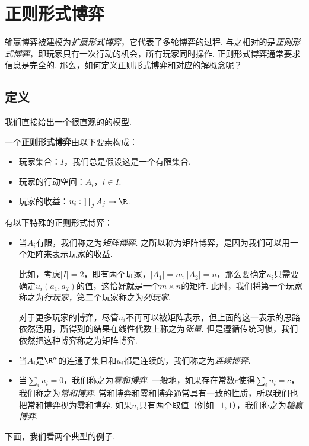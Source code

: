 \section{正则形式博弈}
输赢博弈被建模为\emph{扩展形式博弈}，它代表了多轮博弈的过程. 与之相对的是\emph{正则形式博弈}，即玩家只有一次行动的机会，所有玩家同时操作. 正则形式博弈通常要求信息是完全的. 那么，如何定义正则形式博弈和对应的解概念呢？

\subsection{定义}

我们直接给出一个很直观的的模型. 

\begin{definition}[正则形式博弈]
一个\textbf{正则形式博弈}由以下要素构成：
\begin{itemize}
    \item 玩家集合：$I$，我们总是假设这是一个有限集合.
    \item 玩家的行动空间：$A_i$，$i\in I$.
    \item 玩家的收益：$u_i:\prod_j A_j\to\R$.
\end{itemize}
\end{definition}

有以下特殊的正则形式博弈：
\begin{itemize}
    \item 当$A_i$有限，我们称之为\emph{矩阵博弈}. 之所以称为矩阵博弈，是因为我们可以用一个矩阵来表示玩家的收益. 
    
    比如，考虑$|I|=2$，即有两个玩家，$|A_1|=m,|A_2|=n$，那么要确定$u_i$只需要确定$u_i(a_1,a_2)$的值，这恰好就是一个$m\times n$的矩阵. 此时，我们将第一个玩家称之为\emph{行玩家}，第二个玩家称之为\emph{列玩家}.

    对于更多玩家的博弈，尽管$u_i$不再可以被矩阵表示，但上面的这一表示的思路依然适用，所得到的结果在线性代数上称之为\emph{张量}. 但是遵循传统习惯，我们依然把这种博弈称之为矩阵博弈.

    \item 当$A_i$是$\R^n$的连通子集且和$u_i$都是连续的，我们称之为\emph{连续博弈}.
    \item 当$\sum_i u_i=0$，我们称之为\emph{零和博弈}. 一般地，如果存在常数$c$使得$\sum_i u_i=c$，我们称之为\emph{常和博弈}. 常和博弈和零和博弈通常具有一致的性质，所以我们也把常和博弈视为零和博弈. 如果$u_i$只有两个取值（例如$-1,1$），我们称之为\emph{输赢博弈}.
\end{itemize}

下面，我们看两个典型的例子. 

